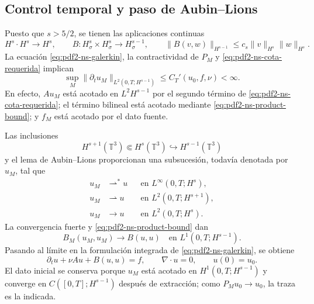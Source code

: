 \subsection{Control temporal y paso de Aubin--Lions}

Puesto que $s>5/2$, se tienen las aplicaciones continuas
\begin{equation}\label{eq:pdf2-ns-product-bound}
 H^s\cdot H^s\longrightarrow H^s,
 \qquad
 B:H^s_\sigma\times H^s_\sigma\longrightarrow H^{s-1}_\sigma,
 \qquad
 \|B(v,w)\|_{H^{s-1}}\le c_s\|v\|_{H^s}\|w\|_{H^s}.
\end{equation}
La ecuación \eqref{eq:pdf2-ns-galerkin}, la contractividad de $P_M$ y
\eqref{eq:pdf2-ns-cota-requerida} implican
\begin{equation}\label{eq:pdf2-ns-time-bound}
 \sup_M\|\partial_tu_M\|_{L^2(0,T;H^{s-1})}
 \le C_T'(u_0,f,\nu)<\infty.
\end{equation}
En efecto, $Au_M$ está acotado en $L^2H^{s-1}$ por el segundo término de
\eqref{eq:pdf2-ns-cota-requerida}; el término bilineal está acotado mediante
\eqref{eq:pdf2-ns-product-bound}; y $f_M$ está acotado por el dato fuente.

Las inclusiones
\[
 H^{s+1}(\mathbb T^3)\Subset H^s(\mathbb T^3)
 \hookrightarrow H^{s-1}(\mathbb T^3)
\]
y el lema de Aubin--Lions proporcionan una subsucesión, todavía denotada por $u_M$,
tal que
\begin{equation}\label{eq:pdf2-ns-compactness}
 \begin{aligned}
 u_M&\rightharpoonup^*u&&\text{en }L^\infty(0,T;H^s),\\
 u_M&\rightharpoonup u&&\text{en }L^2(0,T;H^{s+1}),\\
 u_M&\longrightarrow u&&\text{en }L^2(0,T;H^s).
 \end{aligned}
\end{equation}
La convergencia fuerte y \eqref{eq:pdf2-ns-product-bound} dan
\begin{equation}\label{eq:pdf2-ns-nonlinear-limit}
 B_M(u_M,u_M)\longrightarrow B(u,u)
 \quad\text{en }L^1(0,T;H^{s-1}).
\end{equation}
Pasando al límite en la formulación integrada de
\eqref{eq:pdf2-ns-galerkin}, se obtiene
\begin{equation}\label{eq:pdf2-ns-limit-equation}
 \partial_tu+\nu Au+B(u,u)=f,
 \qquad \nabla\!\cdot u=0,
 \qquad u(0)=u_0.
\end{equation}
El dato inicial se conserva porque
$u_M$ está acotado en $H^1(0,T;H^{s-1})$ y converge en
$C([0,T];H^{s-1})$ después de extracción; como $P_Mu_0\to u_0$, la traza es la
indicada.

